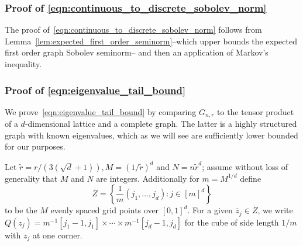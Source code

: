\documentclass{article}
\newcommand{\set}[1]{\left\{#1\right\}}
\newcommand{\1}{\mathbf{1}}
\newcommand{\wt}[1]{\widetilde{#1}}
\theoremstyle{alden}
\theoremstyle{aldenthm}
\theoremstyle{definition}
\theoremstyle{remark}
\begin{document}
\subsubsection{Proof of \eqref{eqn:continuous_to_discrete_sobolev_norm}}

The proof of~\eqref{eqn:continuous_to_discrete_sobolev_norm} follows from Lemma~\ref{lem:expected_first_order_seminorm}--which upper bounds the expected first order graph Sobolev seminorm-- and then an application of Markov's inequality.

\subsubsection{Proof of \eqref{eqn:eigenvalue_tail_bound}}
\label{subsubsec:eigenvalue_tail_bound_pf}

We prove~\eqref{eqn:eigenvalue_tail_bound} by comparing $G_{n,r}$ to the tensor product of a $d$-dimensional lattice and a complete graph. The latter is a highly structured graph with known eigenvalues, which as we will see are sufficiently lower bounded for our purposes.

Let $\wt{r} = r/(3(\sqrt{d} + 1)), M = (1/\wt{r})^d$ and $N = n\wt{r}^d$; assume without loss of generality that $M$ and $N$ are integers. Additionally for $m = M^{1/d}$ define
\begin{equation*}
\overline{Z} = \set{\frac{1}{m}(j_1,\ldots,j_d): j \in [m]^d}
\end{equation*}
to be the $M$ evenly spaced grid points over $[0,1]^d$.
For a given $\overline{z}_j \in \overline{Z}$, we write $Q(z_j) = m^{-1}[j_1 - 1,j_1] \times \cdots \times m^{-1}[j_d - 1,j_d]$ for the cube of side length $1/m$ with $z_j$ at one corner. 
\end{document}
